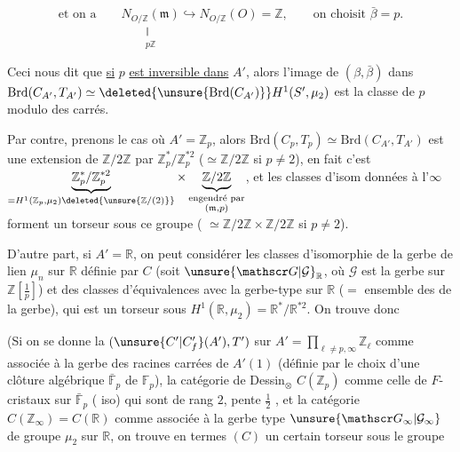 \[
\text{et on a}\qquad \underset{\substack{\Vert\\p\mathbb Z}}{N_{O/\mathbb Z}(\mathfrak m)}
\hookrightarrow N_{O/\mathbb Z}(O)=\mathbb Z,\qquad \text{on choisit }\bar\beta=p.
\]

Ceci nous dit que \uline{si} $p$ \uline{est inversible dans} $A'$, alors
l'image de $(\beta,\bar\beta)$ dans $\mathrm{Brd}(C_{A'},T_{A'})\simeq\deleted{\unsure{\mathrm{Brd}(C_{A'})}}H^1(S',\mu_2)$
est la classe de $p$ modulo des carrés.

Par contre, prenons le cas où $A'=\mathbb Z_p$, alors
$\mathrm{Brd}(C_p,T_p)\simeq\mathrm{Brd}(C_{A'},T_{A'})$ est une extension de $\mathbb Z/2\mathbb Z$ par
$\mathbb Z_p^*/\mathbb Z_p^{*2}$ ($\simeq\mathbb Z/2\mathbb Z$ si $p\ne2$), en fait c'est
$\underbrace{\mathbb Z_p^*/\mathbb Z_p^{*2}}_{=H^1(\mathbb Z_p,\mu_2)\deleted{\unsure{\mathbb Z/(2)}}}\times
\underbrace{\mathbb Z/2\mathbb Z}_{\substack{\text{engendré par}\\(\mathfrak m,p)}}$, et les
classes d'isom  données à l'$\infty$  forment un torseur
sous ce groupe ( $\simeq\mathbb Z/2\mathbb Z\times\mathbb Z/2\mathbb Z$ si $p\ne2$).

D'autre part, si $A'=\mathbb R$, on peut considérer les classes d'isomorphie de la gerbe de lien $\mu_n$ sur $\mathbb R$ définie par $C$
(soit $\unsure{\mathscr G|\mathcal G}_{\mathbb R}$, où $\mathscr G$ est la gerbe sur $\mathbb Z[\frac1p]$) et  des
classes d'équivalences avec la gerbe-type sur $\mathbb R$
($=$ ensemble des  de la gerbe), qui est un
torseur sous $H^1(\mathbb R,\mu_2)=\mathbb R^*/\mathbb R^{*2}$. On trouve donc


(Si on se donne la  
$(\unsure{C'|C'_f}(A'),T')$ sur $A'=\prod_{\ell\ne p,\infty}\mathbb Z_\ell$ comme
associée à la gerbe des racines carrées de $A'(1)$ (définie
par le choix d'une clôture algébrique $\bar{\mathbb F}_p$ de $\mathbb F_p$),  la
catégorie de Dessin$_\otimes$ $C(\mathbb Z_p)$ comme celle de $F$-cristaux sur $\bar{\mathbb F}_p$
( iso) qui sont de rang $2$,  pente $\frac12$ , et la 
catégorie $C(\mathbb Z_\infty)=C(\mathbb R)$ comme associée à la gerbe
type $\unsure{\mathscr G_\infty|\mathcal G_\infty}$ de groupe $\mu_2$ sur $\mathbb R$, on trouve en termes  $(C)$ un
certain torseur  sous le groupe

